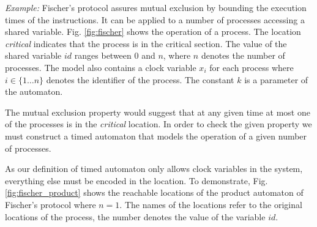 \emph{Example:}
Fischer's protocol assures mutual exclusion by bounding the execution
times of the instructions. It can be applied to a number of processes accessing a
shared variable. Fig. \ref{fig:fischer}  shows the operation of a process.
The location \emph{critical} indicates that the process is in the critical
section. The value of the shared variable $id$ ranges between 0 and $n$,
where $n$ denotes the number of processes. The model also contains a 
clock variable $x_i$ for each process where $i \in \{1 \ldots n\}$ denotes the
identifier of the process. The constant $k$ is a parameter of the automaton.



The mutual exclusion property would suggest that at any given time
at most one of the processes is in the \emph{critical} location. In order to
check the given property we must construct a timed automaton that models the
operation of a given number of processes.

As our definition of timed automaton only allows clock variables in the system,
everything else must be encoded in the location.
To
demonstrate, Fig.
\ref{fig:fischer_product} shows the reachable locations of the product automaton
of Fischer's protocol where $n=1$. The names of the locations refer to the original locations of the process, the number denotes the value of the variable $id$.


